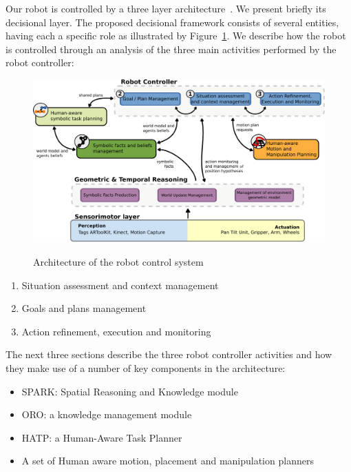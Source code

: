 \documentclass{svmult}
\begin{document}
Our robot is controlled by a three layer
architecture~\cite{Alami1998}.  We present briefly its decisional
layer. The proposed decisional framework consists of several entities,
having each a specific role as illustrated by
Figure~\ref{architecture_fg}.  We describe how the robot is controlled
through an analysis of the three main activities performed by the
robot controller:

\begin{figure}[thpb]
  \centering
  \includegraphics[width=1.0\textwidth]{./figs/architecture-overview.pdf} \\
  \caption {Architecture of the robot control system}
  \label{architecture_fg}
\end{figure}

\begin {enumerate}
\item Situation assessment and context management 
\item Goals and plans management
\item Action refinement, execution and monitoring
\end {enumerate}

The next three sections describe the three robot controller
activities and how they make use of a number of key components in the
architecture:

\begin{itemize}
\item SPARK: Spatial Reasoning and Knowledge module \cite{Sisbot2011}
\item ORO: a knowledge management module \cite{Lemaignan2010}
\item HATP: a Human-Aware Task Planner \cite{Alili2008}
\item A set of Human aware motion, placement and manipulation planners
 \cite{Sisbot2008, Mainprice2011, Pandey2010}
\end{itemize}
\end{document}
